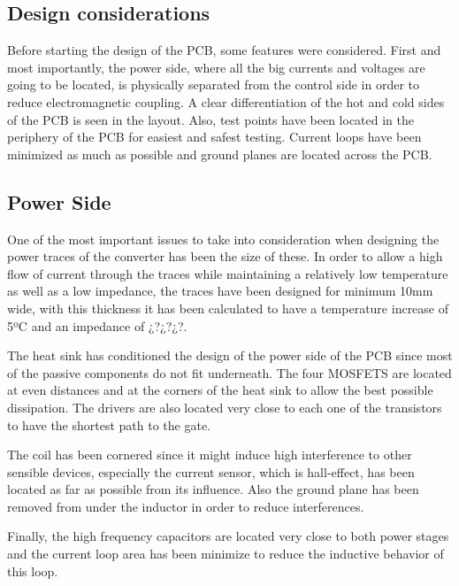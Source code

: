 \subsection{Design considerations} \label{PCB_Considerations}
Before starting the design of the PCB, some features were considered. First and most importantly, the power side, where all the big currents and voltages are going to be located, is physically separated from the control side in order to reduce electromagnetic coupling.  A clear differentiation of the hot and cold sides of the PCB is seen in the layout.  Also, test points have been located in the periphery of the PCB for easiest and safest testing. Current loops have been minimized as much as possible and ground planes are located across the PCB. 

\subsection{Power Side} \label{PCB_Power}
One of the most important issues to take into consideration when designing the power traces of the converter has been the size of these. In order to allow a high flow of current through the traces while maintaining a relatively low temperature as well as a low impedance, the traces have been designed for minimum 10mm wide, with this thickness it has been calculated to have a temperature increase of 5ºC and an impedance of ¿?¿?¿?.   

The heat sink has conditioned the design of the power side of the PCB since most of the passive components do not fit underneath. The four MOSFETS are located at even distances and at the corners of the heat sink to allow the best possible dissipation. The drivers are also located very close to each one of the transistors to have the shortest path to the gate.

The coil has been cornered since it might induce high interference to other sensible devices, especially the current sensor, which is hall-effect, has been located as far as possible from its influence. Also the ground plane has been removed from under the inductor in order to reduce interferences.

Finally, the high frequency capacitors are located very close to both power stages and the current loop area has been minimize to reduce the inductive behavior of this loop. 

